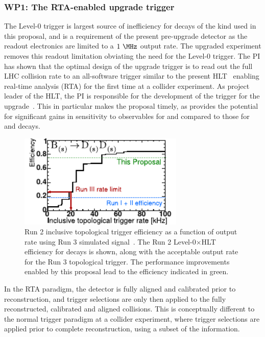 \documentclass[11pt,a4paper]{article}
\begin{document}
\subsubsection{WP1: The RTA-enabled upgrade trigger}
The Level-0 trigger is largest source of inefficiency for  decays of the kind used in this proposal, and is a requirement of the present \LHCb pre-upgrade detector as the readout electronics are limited to a $1~\MHz$ output rate. The upgraded \LHCb experiment removes this readout limitation obviating the need for the Level-0 trigger. The PI has shown that the optimal design of the upgrade trigger is to read out the full LHC collision rate to an all-software trigger similar to the present HLT~\cite{LHCb-PUB-2014-027} enabling real-time analysis (RTA) for the first time at a collider experiment. As project leader of the HLT, the PI is responsible for the development of the trigger for the upgrade~\cite{CERN-LHCC-2014-016}. This in particular makes the proposal timely, as provides the potential for significant gains in sensitivity to \CP observables for \HepProcess{\PBs\to\PDsplus\PDsminus} and \HepProcess{\PBzero\to\PDplus\PDminus} compared to those for \HepProcess{\PBs\to\PJpsi\Pphi} and \HepProcess{\PBzero\to\PJpsi\PKshort} decays.

\begin{figure}
    \centering
    \includegraphics[width=0.7\textwidth]{figs/dsds_topo-crop.pdf}
    \caption{Run 2 inclusive topological trigger efficiency as a function of output rate using Run 3 simulated signal~\cite{LHCb-PUB-2014-040}. The Run 2 Level-0$\times$HLT efficiency for \HepProcess{\PB\to\PD\PD} decays is shown, along with the acceptable output rate for the Run 3 topological trigger. The performance improvements enabled by this proposal lead to the efficiency indicated in green.}
    \label{fig:topo}
\end{figure}

In the RTA paradigm, the detector is fully aligned and calibrated prior to reconstruction, and trigger selections are only then applied to the fully reconstructed, calibrated and aligned collisions. This is conceptually different to the normal trigger paradigm at a collider experiment, where trigger selections are applied prior to complete reconstruction, using a subset of the information. 
\end{document}
